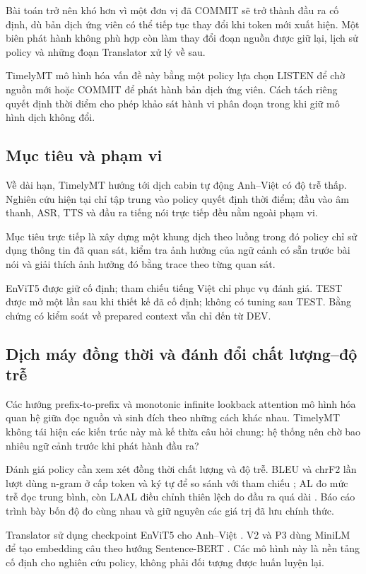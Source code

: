 \documentclass[11pt,a4paper]{article}
\numberwithin{figure}{section}
\numberwithin{table}{section}
\begin{document}
Bài toán trở nên khó hơn vì một đơn vị đã COMMIT sẽ trở thành đầu ra cố định, dù bản dịch ứng viên có thể tiếp tục thay đổi khi token mới xuất hiện. Một biên phát hành không phù hợp còn làm thay đổi đoạn nguồn được giữ lại, lịch sử policy và những đoạn Translator xử lý về sau.

TimelyMT mô hình hóa vấn đề này bằng một policy lựa chọn LISTEN để chờ nguồn mới hoặc COMMIT để phát hành bản dịch ứng viên. Cách tách riêng quyết định thời điểm cho phép khảo sát hành vi phân đoạn trong khi giữ mô hình dịch không đổi.

\subsection{Mục tiêu và phạm vi}
Về dài hạn, TimelyMT hướng tới dịch cabin tự động Anh--Việt có độ trễ thấp. Nghiên cứu hiện tại chỉ tập trung vào policy quyết định thời điểm; đầu vào âm thanh, ASR, TTS và đầu ra tiếng nói trực tiếp đều nằm ngoài phạm vi.

Mục tiêu trực tiếp là xây dựng một khung dịch theo luồng trong đó policy chỉ sử dụng thông tin đã quan sát, kiểm tra ảnh hưởng của ngữ cảnh có sẵn trước bài nói và giải thích ảnh hưởng đó bằng trace theo từng quan sát.

EnViT5 được giữ cố định; tham chiếu tiếng Việt chỉ phục vụ đánh giá. TEST được mở một lần sau khi thiết kế đã cố định; không có tuning sau TEST. Bằng chứng có kiểm soát về prepared context vẫn chỉ đến từ DEV.

\subsection{Dịch máy đồng thời và đánh đổi chất lượng--độ trễ}
Các hướng prefix-to-prefix \citep{ma2019stacl} và monotonic infinite lookback attention \citep{arivazhagan2019monotonic} mô hình hóa quan hệ giữa đọc nguồn và sinh đích theo những cách khác nhau. TimelyMT không tái hiện các kiến trúc này mà kế thừa câu hỏi chung: hệ thống nên chờ bao nhiêu ngữ cảnh trước khi phát hành đầu ra?

Đánh giá policy cần xem xét đồng thời chất lượng và độ trễ. BLEU và chrF2 lần lượt dùng n-gram ở cấp token và ký tự để so sánh với tham chiếu \citep{papineni2002bleu,popovic2015chrf}; AL đo mức trễ đọc trung bình, còn LAAL điều chỉnh thiên lệch do đầu ra quá dài \citep{ma2019stacl,papi2022laal}. Báo cáo trình bày bốn độ đo cùng nhau và giữ nguyên các giá trị đã lưu chính thức.

Translator sử dụng checkpoint EnViT5 cho Anh--Việt \citep{ngo2022mtet}. V2 và P3 dùng MiniLM để tạo embedding câu theo hướng Sentence-BERT \citep{reimers2019sentencebert,wang2020minilm}. Các mô hình này là nền tảng cố định cho nghiên cứu policy, không phải đối tượng được huấn luyện lại.
\end{document}
